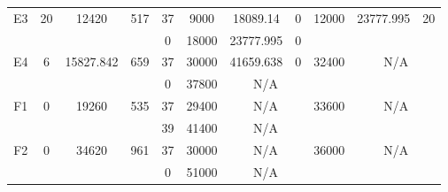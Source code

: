 \begin{sidewaystable}
\begin{tabular}{c||c|c|c||c|c|c|c||c|c|c}
         &
        
      \\
      \hline
      \multirow{2}{*}{E3} &
      \multirow{2}{*}{20} &
      \multirow{2}{*}{12420} &
      \multirow{2}{*}{517} &
      37 &
      9000 &
        18089.14 &
        0 &
      \multirow{2}{*}{12000} &
        \multirow{2}{*}{23777.995} &
        \multirow{2}{*}{20}
      \\
      \cline{5-8}
       &
       &
       &
       &
      0 &
      18000 &
        23777.995 &
        0 &
      
         &
        
      \\
      \hline
      \multirow{2}{*}{E4} &
      \multirow{2}{*}{6} &
      \multirow{2}{*}{15827.842} &
      \multirow{2}{*}{659} &
      37 &
      30000 &
        41659.638 &
        0 &
      \multirow{2}{*}{32400} &
        \multicolumn{2}{c}{\multirow{2}{*}{N/A}}
      \\
      \cline{5-8}
       &
       &
       &
       &
      0 &
      37800 &
        \multicolumn{2}{|c||}{N/A} &
      
        
      \\
      \hline
      \multirow{2}{*}{F1} &
      \multirow{2}{*}{0} &
      \multirow{2}{*}{19260} &
      \multirow{2}{*}{535} &
      37 &
      29400 &
        \multicolumn{2}{|c||}{N/A} &
      \multirow{2}{*}{33600} &
        \multicolumn{2}{c}{\multirow{2}{*}{N/A}}
      \\
      \cline{5-8}
       &
       &
       &
       &
      39 &
      41400 &
        \multicolumn{2}{|c||}{N/A} &
      
        
      \\
      \hline
      \multirow{2}{*}{F2} &
      \multirow{2}{*}{0} &
      \multirow{2}{*}{34620} &
      \multirow{2}{*}{961} &
      37 &
      30000 &
        \multicolumn{2}{|c||}{N/A} &
      \multirow{2}{*}{36000} &
        \multicolumn{2}{c}{\multirow{2}{*}{N/A}}
      \\
      \cline{5-8}
       &
       &
       &
       &
      0 &
      51000 &
        \multicolumn{2}{|c||}{N/A} &
      
        
      \\
\end{tabular}
\label{table:RASDATASET2} 
\end{sidewaystable}
